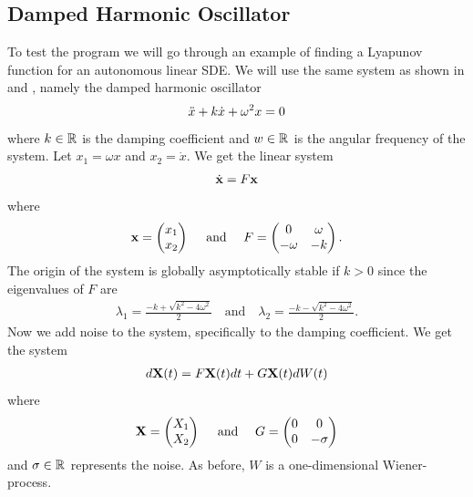\documentclass[a4paper,12pt,twoside,BCOR=10mm]{scrbook}
\begin{document}
\subsection{Damped Harmonic Oscillator}
To test the program we will go through an example of finding a Lyapunov function for an autonomous linear SDE. We will use the same system as shown in \citep{sdestab2012khaminskii} and \citep{HGGS2018localLya}, namely the damped harmonic oscillator
\begin{align*}
    \Ddot{x} + k\Dot{x} + \omega^2x = 0
\end{align*}
where $k\in\mathbb{R}^{}$ is the damping coefficient and $w \in \mathbb{R}^{}$ is the angular frequency of the system. Let $x_1 = \omega x$ and $x_2 = \Dot{x}$. We get the linear system
\begin{align*}
\Dot{\mathbf{x}} = F\mathbf{x}    
\end{align*}
where
\begin{align*}
    \mathbf{x} = \begin{pmatrix}
    x_1\\
    x_2
    \end{pmatrix}
    \quad \text{ and }
    \quad
    F = \begin{pmatrix}
    0 & \omega\\
    -\omega & -k
    \end{pmatrix}.
\end{align*}
The origin of the system is globally asymptotically stable if $k > 0$ since the eigenvalues of $F$ are
\begin{align*}
    \lambda_1 = \frac{-k + \sqrt{k^2 - 4\omega^2}}{2} \quad \text{and} \quad \lambda_2 = \frac{-k - \sqrt{k^2 - 4\omega^2}}{2}.
\end{align*}
Now we add noise to the system, specifically to the damping coefficient. We get the system
\begin{align*}
    d\mathbf{X}(t) = F\mathbf{X}(t)dt + G\mathbf{X}(t)dW(t)
\end{align*}
where
\begin{align*}
    \mathbf{X} = \begin{pmatrix}
    X_1\\
    X_2
    \end{pmatrix}
    \quad
    \text{ and }
    \quad
    G = \begin{pmatrix}
    0 & 0\\
    0 & -\sigma
    \end{pmatrix}
\end{align*}
and $\sigma\in \mathbb{R}^{}$ represents the noise. As before, $W$ is a one-dimensional Wiener-process.
\end{document}
